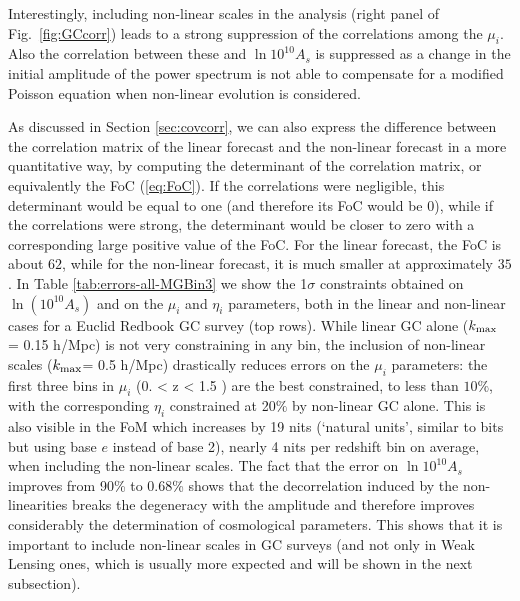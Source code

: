 Interestingly, including non-linear scales in the analysis (right panel of Fig.\ \ref{fig:GCcorr})
leads to a strong suppression of the correlations among the $\mu_i$.
Also the correlation between these and $\ln10^{10}A_{s}$ is suppressed
as a change in the initial amplitude of the power spectrum is not able
to compensate for a modified Poisson equation when non-linear evolution 
is considered.

As discussed in Section \ref{sec:covcorr}, we can also express the difference between the correlation matrix of the linear forecast and the non-linear forecast in a more quantitative way, by computing the
determinant of the correlation matrix, or equivalently the FoC (\ref{eq:FoC}). 
If the correlations were negligible, this determinant would be equal to one (and therefore its FoC would be 0), while if the correlations were strong, the determinant
would be closer to zero with a corresponding large positive value of the FoC.
For the linear forecast, the FoC is about $62$, while for the non-linear forecast, it is much smaller at approximately $35$. 
In Table \ref{tab:errors-all-MGBin3} we show the 1$\sigma$ constraints obtained on $\ln{(10^{10}A_s)}$
and on the $\mu_i$ and $\eta_i$ parameters, both in the linear and 
non-linear cases for a Euclid Redbook GC survey (top rows).
While linear GC alone ($k_{\rm max}$ = 0.15 h/Mpc) is not very constraining in any bin, the inclusion of non-linear scales ($k_{\rm max} $= 0.5 h/Mpc) drastically reduces errors on the $\mu_{i}$ parameters: the first three bins in $\mu_i$ (0. < z < 1.5 ) are the best constrained, to less than $10\%$, with the corresponding $\eta_i$ constrained at 20$\%$ by non-linear GC alone. This is also visible in the FoM which increases by 19 nits (`natural units', similar to bits but using base $e$ instead of base 2), nearly 4 nits per redshift bin on average, when including the non-linear scales. The fact that the error on $\ln10^{10}A_{s}$ improves from 90\% to 0.68\% shows that the decorrelation induced by the non-linearities breaks the degeneracy with the amplitude and therefore improves considerably the determination of cosmological parameters. This shows that it is important to include non-linear scales in GC surveys (and not only in Weak Lensing ones, which is usually more expected and will be shown in the next subsection).

